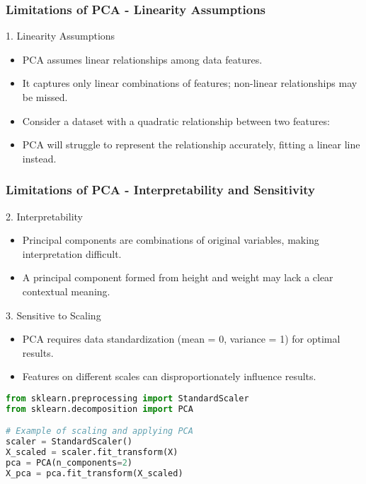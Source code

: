 \documentclass[aspectratio=169]{beamer}
\begin{document}
\begin{frame}[fragile]
  \frametitle{Limitations of PCA - Linearity Assumptions}
  \begin{block}{1. Linearity Assumptions}
    \begin{itemize}
      \item PCA assumes linear relationships among data features.
      \item It captures only linear combinations of features; non-linear relationships may be missed.
    \end{itemize}
  \end{block}
  
  \begin{example}
    \begin{itemize}
      \item Consider a dataset with a quadratic relationship between two features:
      \item PCA will struggle to represent the relationship accurately, fitting a linear line instead.
    \end{itemize}
  \end{example}
\end{frame}

\begin{frame}[fragile]
  \frametitle{Limitations of PCA - Interpretability and Sensitivity}
  \begin{block}{2. Interpretability}
    \begin{itemize}
      \item Principal components are combinations of original variables, making interpretation difficult.
    \end{itemize}
  \end{block}
  
  \begin{example}
    \begin{itemize}
      \item A principal component formed from height and weight may lack a clear contextual meaning.
    \end{itemize}
  \end{example}
  
  \begin{block}{3. Sensitive to Scaling}
    \begin{itemize}
      \item PCA requires data standardization (mean = 0, variance = 1) for optimal results.
      \item Features on different scales can disproportionately influence results.
    \end{itemize}
  \end{block}
  
  \begin{lstlisting}[language=Python]
from sklearn.preprocessing import StandardScaler
from sklearn.decomposition import PCA

# Example of scaling and applying PCA
scaler = StandardScaler()
X_scaled = scaler.fit_transform(X)
pca = PCA(n_components=2)
X_pca = pca.fit_transform(X_scaled)
  \end{lstlisting}
\end{frame}
\end{document}
